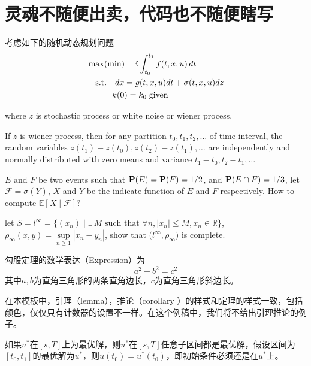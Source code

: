 \documentclass[color=green,mathpazo,titlestyle=hang,11pt]{elegantbook}
\begin{document}
\section{灵魂不随便出卖，代码也不随便瞎写}
\lipsum[3]
考虑如下的随机动态规划问题
\begin{align*}
&\max(\min)\quad \mathbb{E}\int_{t_0}^{t_1}f(t,x,u)\,dt\\
&\quad\mbox{s.t.} \quad dx=g(t,x,u)dt+\sigma(t,x,u)dz\\
&\quad \hspace{2.em} k(0)=k_0\;\text{given}
\end{align*}

where $z$ is stochastic process or white noise or wiener process.

\begin{newdef}
If $z$ is wiener process, then for any partition $t_0,t_1,t_2,\ldots$ of time interval, the random variables $z(t_1)-z(t_0),z(t_2)-z(t_1),\ldots$ are independently and normally distributed with zero means and variance $t_1-t_0,t_2-t_1,\ldots$
\end{newdef}

\lipsum[5]

\begin{example}
$E$ and $F$ be two events such that $\mathbf{P}(E)=\mathbf{P}(F)=1/2$, and $\mathbf{P}(E\cap F)=1/3$, let $\mathscr{F}=\sigma(Y)$,  $X$ and $Y$ be the indicate function of $E$ and $F$ respectively. How to compute $\mathbb{E}[ X\mid \mathscr{F} ]$?
\end{example}
\lipsum[4]
\begin{exercise}
let $S=l^\infty=\big\{(x_n)\mid \exists\, M \text{ such that } \forall n, |x_n|\leq M,x_n\in \mathbb{R}\big\}$, $\rho_{\infty}(x,y)=\sup\limits_{n\geq 1}|x_n-y_n|$, show that $\big(l^\infty,\rho_{\infty}\big)$ is complete.
\end{exercise}

\begin{newthem}[勾股定理]
勾股定理的数学表达（Expression）为
\[a^2+b^2=c^2\]
其中$a,b$为直角三角形的两条直角边长，$c$为直角三角形斜边长。
\end{newthem}

\begin{note}
在本模板中，引理（lemma），推论（corollary ）的样式和定理的样式一致，包括颜色，仅仅只有计数器的设置不一样。在这个例稿中，我们将不给出引理推论的例子。
\end{note}


\lipsum[4]

\begin{newprop}[最优性原理]
如果$u^*$在$[s,T]$上为最优解，则$u^*$在$[s,T]$任意子区间都是最优解，假设区间为$[t_0,t_1]$的最优解为$u^*$，则$u(t_0)=u^{*}(t_0)$，即初始条件必须还是在$u^*$上。
\end{newprop}
\end{document}

